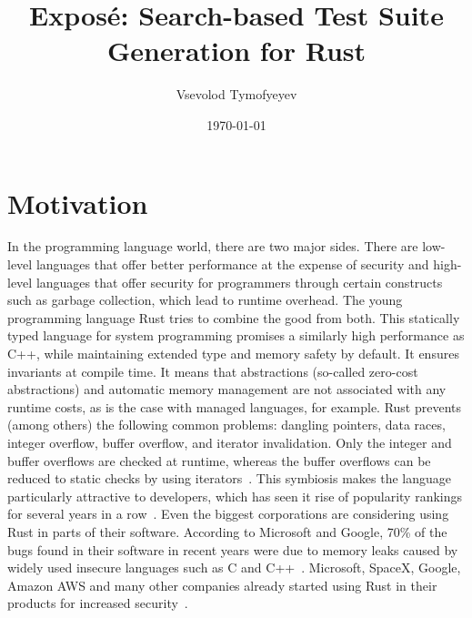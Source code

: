 \documentclass{article}
\begin{document}
\title{Exposé: Search-based Test Suite Generation for Rust}
\author{Vsevolod Tymofyeyev}
\date{\today}
\maketitle

\section{Motivation}
In the programming language world, there are two major sides. There are low-level languages that offer better performance at the expense of security and high-level languages that offer security for programmers through certain constructs such as garbage collection, which lead to runtime overhead. The young programming language Rust tries to combine the good from both. This statically typed language for system programming promises a similarly high performance as C++, while maintaining extended type and memory safety by default. It ensures invariants at compile time. It means that abstractions (so-called zero-cost abstractions) and automatic memory management are not associated with any runtime costs, as is the case with managed languages, for example. Rust prevents (among others) the following common problems: dangling pointers, data races, integer overflow, buffer overflow, and iterator invalidation. Only the integer and buffer overflows are checked at runtime, whereas the buffer overflows can be reduced to static checks by using iterators~\cite{Anderson2016}. This symbiosis makes the language particularly attractive to developers, which has seen it rise of popularity rankings for several years in a row~\cite{StackOverflow2020}. Even the biggest corporations are considering using Rust in parts of their software. According to Microsoft and Google, 70\% of the bugs found in their software in recent years were due to memory leaks caused by widely used insecure languages such as C and C++~\cite{Microsoft2019MemoryBugs, RustInAndroid}. Microsoft, SpaceX, Google, Amazon AWS and many other companies already started using Rust in their products for increased security~\cite{MicrosoftJoinsRust, AmazonLovesRust, RustInAndroid, GoogleRustFoundation}.
\end{document}

